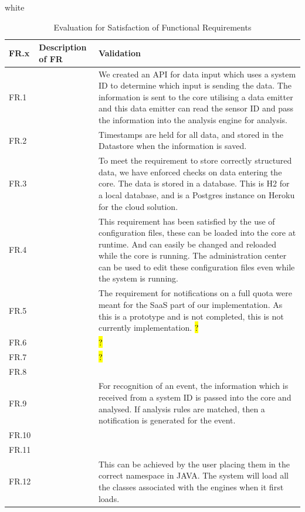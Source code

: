 \documentclass[10pt,a4paper]{article}
\newcommand{\xtableformat}[4]{
\begin{table}[ht!]
\centering
  \rowcolors{2}{gray!10} {white}
\begin{tabularx}{\textwidth}{#1}
  \hline
  \rowcolor[gray]{0.9} #2
  \hline
\end{tabularx}
\caption{#3}
\label{#4}
\end{table}}
\begin{document}
\xtableformat{ p{1.6cm}  p{4.4cm}  p{8.6cm} }{ 
	FR.x  & 	Description of FR  & 	Validation \\ \hline
	FR.1  & 	  & 	We created an API for data input which uses a system ID to determine which input is sending the data. The information is sent to the core utilising a data emitter and this data emitter can read the sensor ID and pass the information into the analysis engine for analysis. \\
	FR.2  & 	  & 	Timestamps are held for all data, and stored in the Datastore when the information is saved. \\
	FR.3  & 	  & 	To meet the requirement to store correctly structured data, we have enforced checks on data entering the core. The data is stored in a database. This is H2 for a local database, and is a Postgres instance on Heroku for the cloud solution. \\ 
	FR.4  & 	  & 	This requirement has been satisfied by the use of configuration files, these can be loaded into the core at runtime. And can easily be changed and reloaded while the core is running. The administration center can be used to edit these configuration files even while the system is running. \\ 
	FR.5  & 	  & 	The requirement for notifications on a full quota were meant for the SaaS part of our implementation. As this is a prototype and is not completed, this is not currently implementation. \hl{?} \\
	FR.6  & 	  & 	  \hl{?} \\ 
	FR.7  & 	  & 	  \hl{?} \\ 
	FR.8  & 	  & 	 \\ 
	FR.9  & 	  & 	For recognition of an event, the information which is received from a system ID is passed into the core and analysed. If analysis rules are matched, then a notification is generated for the event. \\
	FR.10  & 	  & 	 \\ 
	FR.11  & 	  & 	 \\ 
	FR.12  & 	  & 	This can be achieved by the user placing them in the correct namespace in JAVA. The system will load all the classes associated with the engines when it first loads. \\ 
}{Evaluation for Satisfaction of Functional Requirements}{frevaltable}
\end{document}
